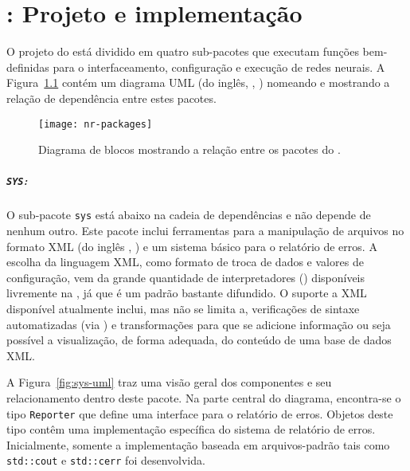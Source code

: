 \typeout{ ====================================================================}
\typeout{ ====================================================================}

\chapter{: Projeto e implementação}
\label{ap:framework}

O projeto do  está dividido em quatro sub-pacotes que
executam funções bem-definidas para o interfaceamento, configuração e execução
de redes neurais. A Figura~\ref{fig:nr-packages} contém um diagrama UML (do
inglês, , \cite{booch}) nomeando e
mostrando a relação de dependência entre estes pacotes.

\begin{figure}
\begin{center}
\texttt{[image: nr-packages]}
\end{center}
\caption{Diagrama de blocos mostrando a relação entre os pacotes do
.}
\label{fig:nr-packages}
\end{figure}

\paragraph{\texttt{SYS}:} O sub-pacote \texttt{sys} está abaixo na cadeia de
dependências e não depende de nenhum outro. Este pacote inclui ferramentas
para a manipulação de arquivos no formato XML (do inglês
, \cite{xml}) e um sistema básico para
o relatório de erros. A escolha da linguagem XML, como formato de troca de
dados e valores de configuração, vem da grande quantidade de interpretadores
() disponíveis livremente na , já que é um padrão
bastante difundido. O suporte a XML disponível atualmente inclui, mas não se
limita a, verificações de sintaxe automatizadas (via
) e transformações para que se adicione informação ou seja
possível a visualização, de forma adequada, do conteúdo de uma base de dados
XML.

A Figura~\ref{fig:sys-uml} traz uma visão geral dos componentes e seu
relacionamento dentro deste pacote. Na parte central do diagrama, encontra-se o
tipo \texttt{Reporter} que define uma interface para o relatório de
erros. Objetos deste tipo contêm uma implementação específica do sistema de
relatório de erros. Inicialmente, somente a implementação baseada em
arquivos-padrão tais como \texttt{std::cout} e \texttt{std::cerr}
\cite{web:gcc-stl} foi desenvolvida. 

